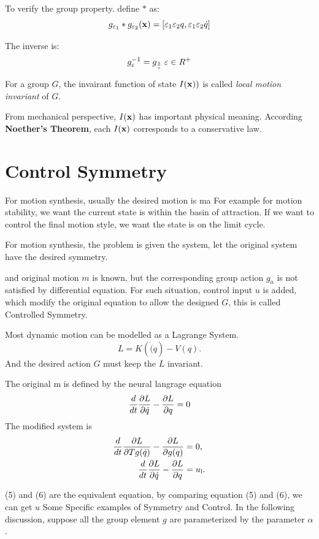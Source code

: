 To verify the group property. define $*$ as:
\[
g_{\varepsilon_1}*g_{\varepsilon_2}(\mathbf{x})=[\varepsilon_1 \varepsilon_2 q, \varepsilon_1 \varepsilon_2 \dot{q}]
\]

The inverse is:
\[
g_{\varepsilon}^{-1}=g_{\frac{1}{\varepsilon}} \;\varepsilon \in R^+
\]

\begin{mydef}
For a group $G$, the invairant function of state $I(\mathbf{x}))$ is called \emph{local motion invariant} of $G$. 
\end{mydef}

From mechanical perspective,  $I(\mathbf{x})$ has important physical meaning. 
According  \textbf{Noether's Theorem}, each $I(\mathbf{x})$ corresponds to a conservative law. 


\section{Control Symmetry}
For motion synthesis, usually the desired motion is ma
For example for motion stability, we want the current state is within the basin of attraction.
If we want to control the final motion style, we want the state is on the limit cycle.

For motion synthesis, the problem is given the system, let the original system have the desired symmetry.

 and original motion $m$ is known, but the corresponding group action $g_a$ is not satisfied by differential equation.
For such situation, control input $u$  is added, which modify the original equation to allow the designed $G$, this is called Controlled Symmetry.

Most dynamic motion can be modelled as a Lagrange System. 
\[
L=K(\dot(q)-V(q).
\]
And the desired action $G$ must keep the $L$ invariant. 

The original m is defined by the neural langrage equation
\begin{equation}
\frac{d}{dt} \frac{\partial L}{\partial \dot{q}} - \frac{\partial L}{\partial q} = 0
\label{eq:uncontrolled_euler_lagrange}
\end{equation}
The modified system is 
\begin{align}
\frac{d}{dt} \frac{\partial L}{\partial Tg(\dot{q})} - \frac{\partial L}{\partial g(q)}&=0,\label{eq:liegroup_euler_lagrange}\\
\frac{d}{dt} \frac{\partial L}{\partial \dot{q}} - \frac{\partial L}{\partial q}&=u_{\mathrm{l}}. \label{eq:controlled_euler_lagrange}
\end{align}


(5) and (6) are the equivalent equation, by comparing  equation (5) and (6), we can get $u$
Some Specific examples of Symmetry and Control.
In the following discussion, suppose all the group element $g$ are parameterized by the parameter $\alpha$.


